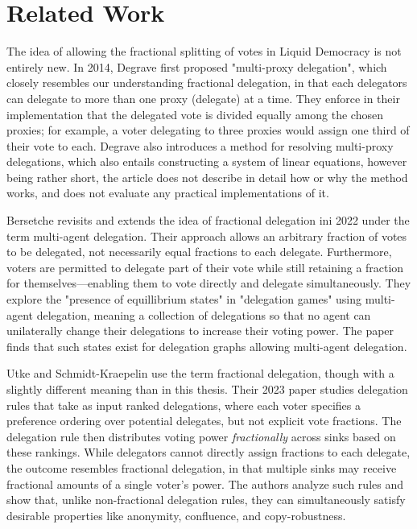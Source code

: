 
\chapter{Related Work}
\label{chap:related_work}

The idea of allowing the fractional splitting of votes in Liquid Democracy is not entirely new. In 2014, Degrave first proposed "multi-proxy delegation", which closely resembles our understanding fractional delegation, in that each delegators can delegate to more than one proxy (delegate) at a time. They enforce in their implementation that the delegated vote is divided equally among the chosen proxies; for example, a voter delegating to three proxies would assign one third of their vote to each. \cite{degraveResolvingMultiproxyTransitive2014} Degrave also introduces a method for resolving multi-proxy delegations, which also entails constructing a system of linear equations, however being rather short, the article does not describe in detail how or why the method works, and does not evaluate any practical implementations of it.

Bersetche revisits and extends the idea of fractional delegation ini 2022 under the term multi-agent delegation. Their approach allows an arbitrary fraction of votes to be delegated, not necessarily equal fractions to each delegate. Furthermore, voters are permitted to delegate part of their vote while still retaining a fraction for themselves—enabling them to vote directly and delegate simultaneously. They explore the "presence of equillibrium states" in "delegation games" using multi-agent delegation, meaning a collection of delegations so that no agent can unilaterally change their delegations to increase their voting power. The paper finds that such states exist for delegation graphs allowing multi-agent delegation.  \cite{bersetcheGeneralizingLiquidDemocracy2022}

Utke and Schmidt-Kraepelin use the term fractional delegation, though with a slightly different meaning than in this thesis. Their 2023 paper studies delegation rules that take as input ranked delegations, where each voter specifies a preference ordering over potential delegates, but not explicit vote fractions. The delegation rule then distributes voting power \textit{fractionally} across sinks based on these rankings. While delegators cannot directly assign fractions to each delegate, the outcome resembles fractional delegation, in that multiple sinks may receive fractional amounts of a single voter's power. The authors analyze such rules and show that, unlike non-fractional delegation rules, they can simultaneously satisfy desirable properties like anonymity, confluence, and copy-robustness. \cite{NEURIPS2023_dbb51809}

